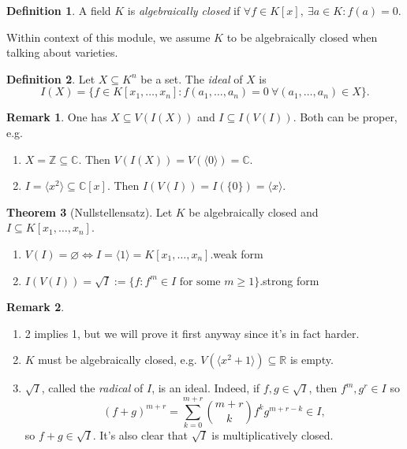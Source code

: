 \documentclass[a4paper]{article}
\newcommand{\la}{\langle}
\newcommand{\ra}{\rangle}
\newcommand{\Z}{\mathbb Z}
\newcommand{\C}{\mathbb C}
\theoremstyle{definition}
\newtheorem{defn}{Definition}[subsection]
\newtheorem{thm}[defn]{Theorem}
\newtheorem*{remark}{Remark}
\begin{document}
\begin{defn}
A field $K$ is \textit{algebraically closed} if $\forall f\in K[x],\ \exists a\in K:f(a)=0$.
\end{defn}
Within context of this module, we assume $K$ to be algebraically closed when talking about varieties.

\begin{defn}
Let $X\subseteq K^n$ be a set. The \textit{ideal} of $X$ is
\[
I(X)=\{f\in K[x_1,\ldots,x_n]:f(a_1,\ldots,a_n)=0 \ \forall (a_1,\ldots,a_n)\in X\}.
\]
\end{defn}

\begin{remark}
One has $X\subseteq V(I(X))$ and $I\subseteq I(V(I))$. Both can be proper, e.g.
\begin{enumerate}
\item $X=\Z\subseteq \C$. Then $V(I(X))=V(\la 0\ra)=\C$.
\item $I=\la x^2\ra\subseteq\C[x]$. Then $I(V(I))=I(\{0\})=\la x\ra$.
\end{enumerate}
\end{remark}

\begin{thm}[Nullstellensatz]
\label{thm:Nullstellensatz}
Let $K$ be algebraically closed and $I\subseteq K[x_1,\ldots,x_n]$.
\begin{enumerate}
\item $V(I)=\varnothing \Leftrightarrow I=\la 1\ra=K[x_1,\ldots,x_n]$.\hfill weak form
\item $I(V(I))=\sqrt I:=\{f:f^m\in I\text{ for some }m\geq 1\}$.\hfill strong form
\end{enumerate}
\end{thm}

\begin{remark}
\begin{enumerate}
\item 2 implies 1, but we will prove it first anyway since it's in fact harder.
\item $K$ must be algebraically closed, e.g. $V(\la x^2+1\ra)\subseteq \mathbb R$ is empty.
\item $\sqrt I$, called the \textit{radical} of $I$, is an ideal. Indeed, if $f,g\in \sqrt I$, then $f^m,g^r\in I$ so
\[
(f+g)^{m+r}=\sum_{k=0}^{m+r}\binom{m+r}{k}f^k g^{m+r-k} \in I,
\]
so $f+g\in\sqrt I$. It's also clear that $\sqrt I$ is multiplicatively closed.

\end{enumerate}
\end{remark}
\end{document}
